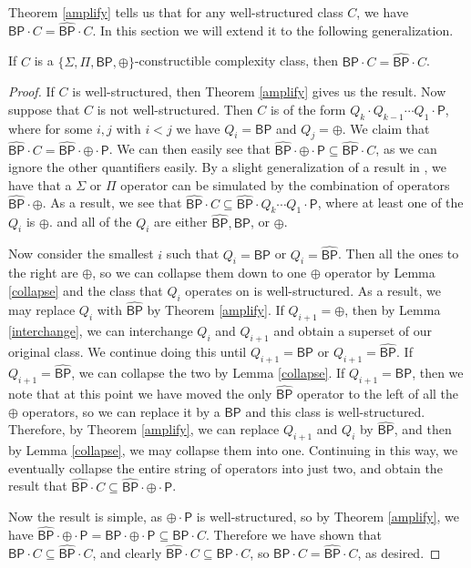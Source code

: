 \documentclass[11pt]{article}
\newcommand{\bp}{\textsf{BP}}
\newcommand{\strongbp}{\widehat{\textsf{BP}}}
\newcommand{\parity}{\oplus}
\newcommand{\p}{\textsf{P}}
\begin{document}
Theorem \ref{amplify} tells us that for any well-structured class $C$, we have $\bp\cdot C = \strongbp\cdot C$. In this section we will extend it to the following generalization.

\begin{theorem}\label{fullamplify}
If $C$ is a $\{\Sigma,\Pi,\bp,\parity\}$-constructible complexity class, then $\bp\cdot C = \strongbp\cdot C$.
\end{theorem}
\begin{proof}
If $C$ is well-structured, then Theorem \ref{amplify} gives us the result. Now suppose that $C$ is not well-structured. Then $C$ is of the form $Q_k\cdot Q_{k-1}\cdots Q_1\cdot \p$, where for some $i,j$ with $i < j$ we have $Q_i = \bp$ and $Q_j = \parity$. We claim that $\strongbp \cdot C = \strongbp \cdot \parity \cdot \p$. We can then easily see that $\strongbp \cdot \parity \cdot \p \subseteq \strongbp \cdot C$, as we can ignore the other quantifiers easily. By a slight generalization of a result in \cite{Toda}, we have that a $\Sigma$ or $\Pi$ operator can be simulated by the combination of operators $\strongbp \cdot \parity$. As a result, we see that $\strongbp \cdot C \subseteq \strongbp \cdot Q_k \cdots Q_1 \cdot \p$, where at least one of the $Q_i$ is $\parity$. and all of the $Q_i$ are either $\strongbp, \bp$, or $\parity$.

Now consider the smallest $i$ such that $Q_i = \bp$ or $Q_i = \strongbp$. Then all the ones to the right are $\parity$, so we can collapse them down to one $\parity$ operator by Lemma \ref{collapse} and the class that $Q_i$ operates on is well-structured. As a result, we may replace $Q_i$ with $\strongbp$ by Theorem \ref{amplify}. If $Q_{i+1} = \parity$, then by Lemma \ref{interchange}, we can interchange $Q_i$ and $Q_{i+1}$ and obtain a superset of our original class. We continue doing this until $Q_{i+1} = \bp$ or $Q_{i+1} = \strongbp$. If $Q_{i+1} = \strongbp$, we can collapse the two by Lemma \ref{collapse}. If $Q_{i+1} = \bp$, then we note that at this point we have moved the only $\strongbp$ operator to the left of all the $\parity$ operators, so we can replace it by a $\bp$ and this class is well-structured. Therefore, by Theorem \ref{amplify}, we can replace $Q_{i+1}$ and $Q_i$ by $\strongbp$, and then by Lemma \ref{collapse}, we may collapse them into one. Continuing in this way, we eventually collapse the entire string of operators into just two, and obtain the result that $\strongbp \cdot C \subseteq \strongbp \cdot \parity \cdot \p$.

Now the result is simple, as $\parity \cdot \p$ is well-structured, so by Theorem \ref{amplify}, we have $\strongbp\cdot\parity\cdot\p = \bp\cdot\parity\cdot\p \subseteq \bp\cdot C$. Therefore we have shown that $\bp \cdot C \subseteq \strongbp \cdot C$, and clearly $\strongbp \cdot C \subseteq \bp \cdot C$, so $\bp\cdot C = \strongbp \cdot C$, as desired.
\end{proof}
\end{document}
